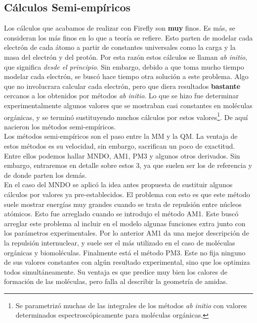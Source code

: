 \documentclass[10pt,letterpaper]{article}
\begin{document}
\subsection{C\'alculos Semi-emp\'iricos}
Los c\'alculos que acabamos de realizar con Firefly son \textbf{muy} finos. Es m\'as, se consideran los m\'as finos en lo que a teor\'ia se refiere. Esto parten de modelar cada electr\'on de cada \'atomo a partir de constantes universales como la carga y la masa del electr\'on y del prot\'on. Por esta raz\'on estos c\'alculos se llaman \textit{ab initio}, que significa \emph{desde el principio}. Sin embargo, debido a que toma mucho tiempo modelar cada electr\'on, se busc\'o hace tiempo otra soluci\'on a este problema. Algo que no involucrara calcular cada electr\'on, pero que diera resultados \textbf{bastante} cercanos a los obtenidos por m\'etodos \textit{ab initio}. Lo que se hizo fue determinar experimentalmente algunos valores que se mostraban casi constantes en mol\'eculas org\'anicas, y se termin\'o sustituyendo muchos c\'alculos por estos valores\footnote{Se parametriz\'o muchas de las integrales de los m\'etodos \textit{ab initio} con valores determinados espectrosc\'opicamente para mol\'eculas org\'anicas.}. De aqu\'i nacieron los m\'etodos semi-emp\'iricos.\\

Los m\'etodos semi-emp\'iricos son el paso entre la MM y la QM. La ventaja de estos m\'etodos es su velocidad, sin embargo, sacrifican un poco de exactitud. Entre ellos podemos hallar MNDO, AM1, PM3 y algunos otros derivados. Sin embargo, entraremos en detalle sobre estos 3, ya que suelen ser los de referencia y de donde parten los dem\'as.\\

En el caso del MNDO se aplic\'o la idea antes propuesta de sustituir algunos c\'alculos por valores ya pre-establecidos. El problema con esto es que este m\'etodo suele mostrar energ\'ias muy grandes cuando se trata de repulsi\'on entre n\'ucleos at\'omicos. Esto fue arreglado cuando se introdujo el m\'etodo AM1. Este busc\'o arreglar este problema al incluir en el modelo algunas funciones extra junto con los par\'ametros experimentales. Por lo anterior AM1 da una mejor descripci\'on de la repulsi\'on internuclear, y suele ser el m\'as utilizado en el caso de mol\'eculas org\'anicas y biomol\'eculas. Finalmente est\'a el m\'etodo PM3. Este no fija ninguno de sus valores constantes con alg\'un resultado experimental, sino que los optimiza todos simult\'aneamente. Su ventaja es que predice muy bien los calores de formaci\'on de las mol\'eculas, pero falla al describir la geometr\'ia de amidas.\\
\end{document}
